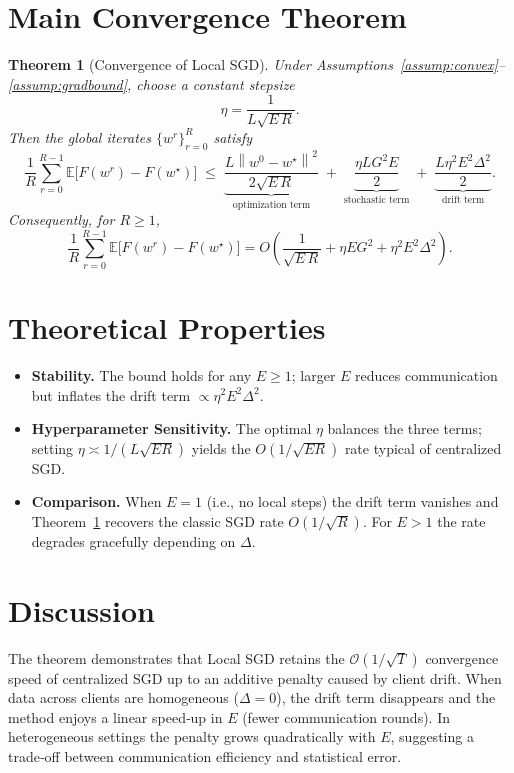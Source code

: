\documentclass[11pt]{article}
\newtheorem{theorem}{Theorem}
\newcommand{\E}{\mathbb{E}}
\newcommand{\norm}[1]{\left\|#1\right\|}
\begin{document}
\section*{Main Convergence Theorem}
\begin{theorem}[Convergence of Local SGD]\label{thm:main}
Under Assumptions~\ref{assump:convex}–\ref{assump:gradbound}, choose a constant stepsize
\[
\eta = \frac{1}{L\sqrt{E\,R}}.
\]
Then the global iterates $\{w^{r}\}_{r=0}^{R}$ satisfy
\[
\frac{1}{R}\sum_{r=0}^{R-1}\E\!\bigl[F(w^{r})-F(w^{\star})\bigr]
\;\le\;
\underbrace{\frac{L\norm{w^{0}-w^{\star}}^{2}}{2\sqrt{E\,R}}}_{\text{optimization term}}
\;+\;
\underbrace{\frac{\eta L G^{2}E}{2}}_{\text{stochastic term}}
\;+\;
\underbrace{\frac{L\eta^{2}E^{2}\Delta^{2}}{2}}_{\text{drift term}}.
\]
Consequently, for $R\ge 1$,
\[
\frac{1}{R}\sum_{r=0}^{R-1}\E\!\bigl[F(w^{r})-F(w^{\star})\bigr]=
O\!\left(\frac{1}{\sqrt{E\,R}}+\eta EG^{2}+ \eta^{2}E^{2}\Delta^{2}\right).
\]
\end{theorem}

\section*{Theoretical Properties}
\begin{itemize}
\item \textbf{Stability.} The bound holds for any $E\ge1$; larger $E$ reduces communication but inflates the drift term $\propto \eta^{2}E^{2}\Delta^{2}$.
\item \textbf{Hyperparameter Sensitivity.} The optimal $\eta$ balances the three terms; setting $\eta\asymp 1/(L\sqrt{E R})$ yields the $O(1/\sqrt{E R})$ rate typical of centralized SGD.
\item \textbf{Comparison.} When $E=1$ (i.e., no local steps) the drift term vanishes and Theorem~\ref{thm:main} recovers the classic SGD rate $O(1/\sqrt{R})$. For $E>1$ the rate degrades gracefully depending on $\Delta$.
\end{itemize}

\section*{Discussion}
The theorem demonstrates that Local SGD retains the $\mathcal{O}(1/\sqrt{T})$ convergence speed of centralized SGD up to an additive penalty caused by client drift. When data across clients are homogeneous ($\Delta=0$), the drift term disappears and the method enjoys a linear speed‑up in $E$ (fewer communication rounds). In heterogeneous settings the penalty grows quadratically with $E$, suggesting a trade‑off between communication efficiency and statistical error.
\end{document}
